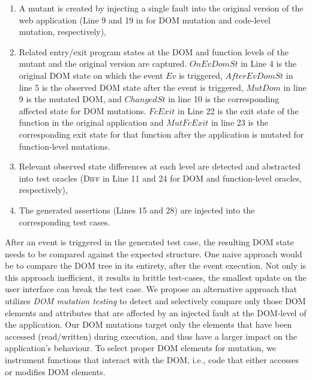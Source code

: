 \begin{enumerate}[noitemsep]
\item A mutant is created by injecting a single fault into the original version of the web application (Line 9 and 19 in  for DOM mutation and code-level mutation, respectively), 
\item Related entry/exit program states at the DOM and \javascript function levels of the mutant and the original version are captured. $OnEvDomSt$ in Line 4 is the original DOM state on which the event $Ev$ is triggered, $AfterEvDomSt$ in line 5 is the observed DOM state after the event is triggered, $MutDom$ in line 9 is the mutated DOM, and $ChangedSt$ in line 10 is the corresponding affected state for DOM mutations. $FcExit$ in Line 22 is the exit
state of the function in the original application and $MutFcExit$ in line 23 is the corresponding exit state for that function after the application is mutated for function-level mutations.
\item Relevant observed state differences at each level are detected and abstracted into test oracles (\textsc{Diff} in Line 11 and 24 for DOM and function-level oracles,  respectively),
\item The generated assertions (Lines 15 and 28) are injected into the corresponding test cases. %
\end{enumerate}


 After an event is triggered in the generated \selenium test case, the resulting DOM state needs to be compared against the expected structure. One naive approach would be to compare the DOM tree in its entirety, after the event execution. 
Not only is this approach inefficient, it results in brittle test-cases, \ie the smallest update on the user interface can break the test case. 
We propose an alternative approach that utilizes  \emph{DOM mutation testing} to detect and selectively compare only those DOM elements and attributes that are affected by an injected fault at the DOM-level of the application.
Our DOM mutations target only the elements that have been accessed (read/written) during execution, and thus have a larger impact on the application's behaviour. 
To select proper DOM elements for mutation, we instrument \javascript functions that interact with the DOM, i.e., code that either accesses or modifies  DOM elements. 


